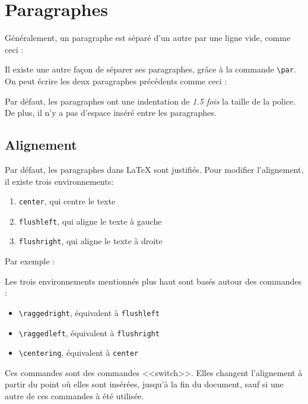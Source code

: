 \section{Paragraphes}

Généralement, un paragraphe est séparé d'un autre par une ligne vide, comme ceci :



Il existe une autre façon de séparer ses paragraphes, grâce à la commande \lstinline|\par|.
On peut écrire les deux paragraphes précédents comme ceci :



Par défaut, les paragraphes ont une indentation de \emph{1.5 fois} la taille de la police.
De plus, il n'y a pas d'espace inséré entre les paragraphes.

\subsection{Alignement}

Par défaut, les paragraphes dans \LaTeX{} sont justifiés.
Pour modifier l'alignement, il existe trois environnements:

\begin{enumerate}
  \item \texttt{center}, qui centre le texte
  \item \texttt{flushleft}, qui aligne le texte à gauche
  \item \texttt{flushright}, qui aligne le texte à droite
\end{enumerate}

Par exemple :



Les trois environnements mentionnés plus haut sont basés autour des commandes :

\begin{itemize}
  \item \lstinline|\raggedright|, équivalent à \texttt{flushleft}
  \item \lstinline|\raggedleft|, équivalent à \texttt{flushright}
  \item \lstinline|\centering|, équivalent à \texttt{center}
\end{itemize}

Ces commandes sont des commandes <<switch>>.
Elles changent l'alignement à partir du point où elles sont insérées, jusqu'à la fin du document,
sauf si une autre de ces commandes à été utilisée.

